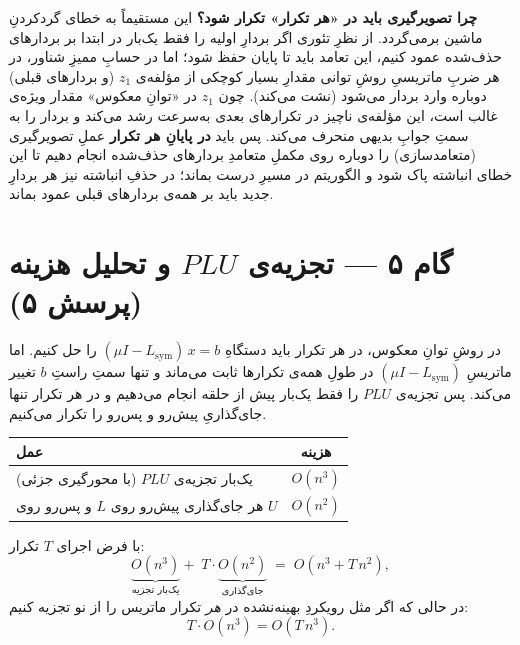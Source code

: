 \documentclass[14pt]{extarticle}
\begin{document}
\smallskip
\noindent\textbf{چرا تصویرگیری باید در «هر تکرار» تکرار شود؟}
این مستقیماً به خطای گردکردنِ ماشین برمی‌گردد. از نظرِ تئوری اگر بردارِ اولیه را فقط یک‌بار در ابتدا بر بردارهای حذف‌شده عمود کنیم، این تعامد باید تا پایان حفظ شود؛ اما در حسابِ ممیزِ شناور، در هر ضربِ ماتریسیِ روشِ توانی مقدارِ بسیار کوچکی از مؤلفه‌ی $z_1$ (و بردارهای قبلی) دوباره وارد بردار می‌شود (نشت می‌کند). چون $z_1$ در «توانِ معکوس» مقدار ویژه‌ی غالب است، این مؤلفه‌ی ناچیز در تکرارهای بعدی به‌سرعت رشد می‌کند و بردار را به سمتِ جوابِ بدیهی منحرف می‌کند. پس باید \textbf{در پایانِ هر تکرار} عملِ تصویرگیری (متعامدسازی) را دوباره روی مکملِ متعامدِ بردارهای حذف‌شده انجام دهیم تا این خطای انباشته پاک شود و الگوریتم در مسیرِ درست بماند؛ در حذفِ انباشته نیز هر بردارِ جدید باید بر همه‌ی بردارهای قبلی عمود بماند.

\newpage
\section{گام ۵ --- تجزیه‌ی $PLU$ و تحلیل هزینه (پرسش ۵)}

در روشِ توانِ معکوس، در هر تکرار باید دستگاهِ $(\mu I-L_{\mathrm{sym}})\,x=b$ را حل کنیم. اما ماتریسِ
$(\mu I-L_{\mathrm{sym}})$ در طولِ همه‌ی تکرارها ثابت می‌ماند و تنها سمتِ راستِ $b$ تغییر می‌کند.
پس تجزیه‌ی $PLU$ را فقط یک‌بار پیش از حلقه انجام می‌دهیم و در هر تکرار تنها جای‌گذاریِ پیش‌رو و پس‌رو را تکرار می‌کنیم.

\begin{center}
\renewcommand{\arraystretch}{1.5}
\setlength{\arrayrulewidth}{0.8pt}
\begin{tabular}{|l|c|}
\hline
\rowcolor{headblue}
{\color{white}\textbf{عمل}} & {\color{white}\textbf{هزینه}} \\ \hline
\rowcolor{boxbg}
یک‌بار تجزیه‌ی $PLU$ (با محورگیری جزئی) & $O(n^3)$ \\ \hline
هر جای‌گذاری پیش‌رو روی $L$ و پس‌رو روی $U$ & $O(n^2)$ \\ \hline
\end{tabular}
\end{center}

\noindent با فرض اجرای $T$ تکرار:
\[
\underbrace{O(n^3)}_{\text{یک‌بار تجزیه}}+\;T\cdot \underbrace{O(n^2)}_{\text{جای‌گذاری}}
\;=\;O\!\left(n^3 + T\,n^2\right),
\]
در حالی که اگر مثل رویکردِ بهینه‌نشده در \emph{هر} تکرار ماتریس را از نو تجزیه کنیم:
\[
T\cdot O(n^3)=O\!\left(T\,n^3\right).
\]
\end{document}
